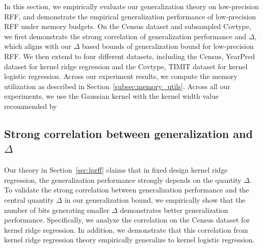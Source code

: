 In this section, we empirically evaluate our generalization theory on low-precision RFF, and demonstrate the empirical generalization performance of low-precision RFF under memory budgets. On the Census dataset and subsampled Covtype, we first demonstrate the strong correlation of generalization performance and $\Delta$, which aligns with our $\Delta$ based bounds of generalization bound for low-precision RFF. We then extend to four different datasets, including the Census, YearPred dataset for kernel ridge regression and the Covtype, TIMIT dataset for kernel logistic regression. Across our experiment results, we compute the memory utilization as described in Section~\ref{subsec:memory_utils}. Across all our experiments, we use the Gaussian kernel with the kernel width value recommended by~\citet{may2017kernel}

\subsection{Strong correlation between generalization and $\Delta$}
Our theory in Section~\ref{sec:lprff} claims that in fixed design kernel ridge regression, the generalization performance strongly depends on the quantity $\Delta$.
To validate the strong correlation between generalization performance and the central quantity $\Delta$ in our generalization bound, we empirically show that the number of bits generating smaller $\Delta$ demonstrates better generalization performance. 
Specifically, we analyze the correlation on the Census dataset for kernel ridge regression. In addition, we demonstrate that this correlation from kernel ridge regression theory empirically generalize to kernel logistic regression. 

